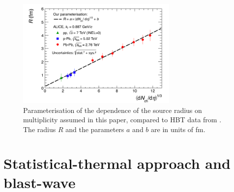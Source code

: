 \documentclass[a4paper,11pt]{scrartcl}
\begin{document}
\begin{figure}[htbp]
\begin{center}
\includegraphics[width=0.7\textwidth]{HbtRadiusParam.png}
\caption{Parameterisation of the dependence of the source radius on multiplicity assumed in this paper, compared to HBT data from \cite{Adam:2015vna, Adam:2015pya, Abelev:2012sq}. The radius $R$ and the parameters $a$ and $b$ are in units of fm.}
\label{fig:radiiparam}
\end{center}
\end{figure}

\section{Statistical-thermal approach and blast-wave}\label{sec:thermal}
\end{document}
